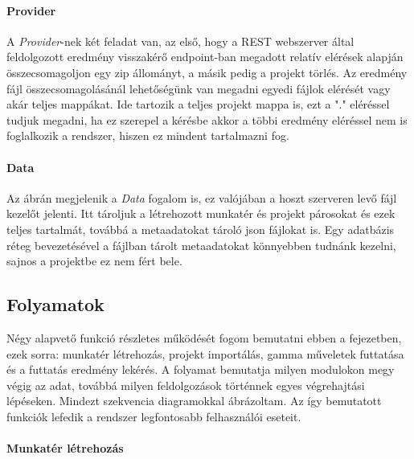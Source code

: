 \paragraph{Provider} A \textit{Provider}-nek két feladat van, az első, hogy a REST webszerver által feldolgozott eredmény visszakérő endpoint-ban megadott relatív elérések alapján összecsomagoljon egy zip állományt, a másik pedig a projekt törlés. Az eredmény fájl összecsomagolásánál lehetőségünk van megadni egyedi fájlok elérését vagy akár teljes mappákat. Ide tartozik a teljes projekt mappa is, ezt a "." eléréssel tudjuk megadni, ha ez szerepel a kérésbe akkor a többi eredmény eléréssel nem is foglalkozik a rendszer, hiszen ez mindent tartalmazni fog.
\paragraph{Data} Az ábrán megjelenik a \textit{Data} fogalom is, ez valójában a hoszt szerveren levő fájl kezelőt jelenti. Itt tároljuk a létrehozott munkatér és projekt párosokat és ezek teljes tartalmát, továbbá a metaadatokat tároló json fájlokat is. Egy adatbázis réteg bevezetésével a fájlban tárolt metaadatokat könnyebben tudnánk kezelni, sajnos a projektbe ez nem fért bele.



\subsection{Folyamatok}

Négy alapvető funkció részletes működését fogom bemutatni ebben a fejezetben, ezek sorra: munkatér létrehozás, projekt importálás, gamma műveletek futtatása és a futtatás eredmény lekérés. A folyamat bemutatja milyen modulokon megy végig az adat, továbbá milyen feldolgozások történnek egyes végrehajtási lépéseken. Mindezt szekvencia diagramokkal ábrázoltam. Az így bemutatott funkciók lefedik a rendszer legfontosabb felhasználói eseteit.


\paragraph{Munkatér létrehozás}


